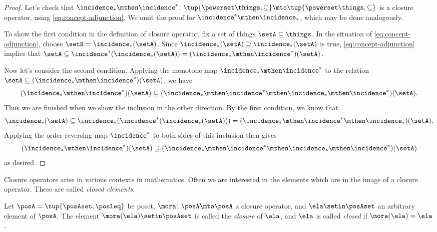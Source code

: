 \begin{proof}
Let's check that $\incidence_* \mthen \incidence^* \colon \tup{\powerset \things, \subseteq} \mto \tup{\powerset \things, \subseteq}$ is a closure operator, using \cref{eq:concept-adjunction}. We omit the proof for $\incidence^* \mthen \incidence_*$, which may be done analogously. 


To show the first condition in the definition of closure operator, fix a set of things $\setA \subseteq \things$. In the situation of \cref{eq:concept-adjunction}, choose $\setB = \incidence_*(\setA)$. Since $\incidence_*(\setA) \supseteq \incidence_*(\setA)$ is true, \cref{eq:concept-adjunction} implies that $\setA \subseteq \incidence^*(\incidence_*(\setA))  = (\incidence_* \mthen \incidence^*)(\setA)$. 

Now let's consider the second condition. Applying the monotone map $\incidence_* \mthen \incidence^*$ to the relation $\setA \subseteq (\incidence_* \mthen \incidence^*)(\setA)$, we have
\begin{equation}
(\incidence_* \mthen \incidence^*)(\setA)  \subseteq  (\incidence_* \mthen \incidence^* \mthen \incidence_* \mthen \incidence^*)(\setA).
\end{equation}
Thus we are finished when we show the inclusion in the other direction. By the first condition, we know that 
\begin{equation}
\incidence_*(\setA) \subseteq \incidence_*( \incidence^* (\incidence_*(\setA))) = (\incidence_* \mthen \incidence^* \mthen \incidence_*)(\setA).
\end{equation}
Applying the order-reversing map $\incidence^*$ to both sides of this inclusion then gives 
\begin{equation}
(\incidence_* \mthen \incidence^*)(\setA) \supseteq (\incidence_* \mthen \incidence^* \mthen \incidence_* \mthen \incidence^*)(\setA)
\end{equation}
as desired. 
\end{proof}

Closure operators arise in various contexts in mathematics. Often we are interested in the elements which are in the image of a closure operator. These are called \emph{closed elements}. 

\begin{definition}
Let $\posA = \tup{\posAset, \posleq}$ be poset, $\mora \colon \posA \mto \posA$ a closure operator, and $\ela \setin \posAset$ an arbitrary element of $\posA$. The element $\mora(\ela) \setin \posAset$ is called the \emph{closure} of $\ela$, and $\ela$ is called \emph{closed} if $\mora(\ela) = \ela$. 
\end{definition}

